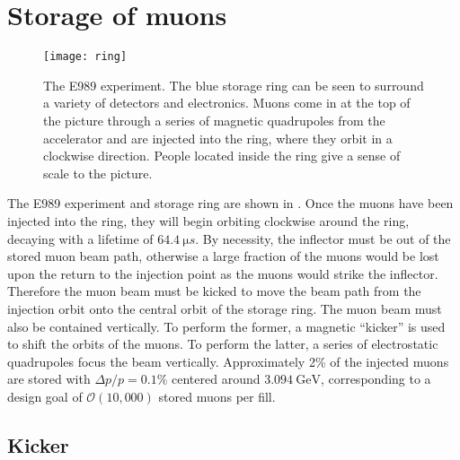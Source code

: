 \section{Storage of muons}
\label{sec:Storage}

\begin{figure}[]
    \centering
    \texttt{[image: ring]}
    \caption[The E989 experiment]{The E989 experiment. The blue storage ring can be seen to surround a variety of detectors and electronics. Muons come in at the top of the picture through a series of magnetic quadrupoles from the accelerator and are injected into the ring, where they orbit in a clockwise direction. People located inside the ring give a sense of scale to the picture.}
    \label{fig:ring}
\end{figure}


The E989 experiment and storage ring are shown in . Once the muons have been injected into the ring, they will begin orbiting clockwise around the ring, decaying with a lifetime of $\SI{64.4}{\micro s}$. By necessity, the inflector must be out of the stored muon beam path, otherwise a large fraction of the muons would be lost upon the return to the injection point as the muons would strike the inflector. Therefore the muon beam must be kicked to move the beam path from the injection orbit onto the central orbit of the storage ring. The muon beam must also be contained vertically. To perform the former, a magnetic ``kicker'' is used to shift the orbits of the muons. To perform the latter, a series of electrostatic quadrupoles focus the beam vertically. Approximately 2\% of the injected muons are stored with $\Delta p / p = 0.1\%$ centered around $\SI{3.094}{\GeV}$, corresponding to a design goal of $\mathcal{O}(10,000)$ stored muons per fill.


\subsection{Kicker}
\label{sub:kicker}

